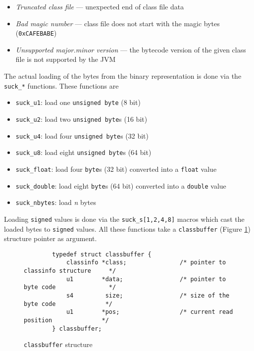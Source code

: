 \begin{itemize}
 \item \textit{Truncated class file} --- unexpected end of class file
 data

 \item \textit{Bad magic number} --- class file does not start with
 the magic bytes (\texttt{0xCAFEBABE})

 \item \textit{Unsupported major.minor version} --- the bytecode
 version of the given class file is not supported by the JVM
\end{itemize}

The actual loading of the bytes from the binary representation is done
via the \texttt{suck\_*} functions. These functions are

\begin{itemize}
 \item \texttt{suck\_u1}: load one \texttt{unsigned byte} (8 bit)

 \item \texttt{suck\_u2}: load two \texttt{unsigned byte}s (16 bit)

 \item \texttt{suck\_u4}: load four \texttt{unsigned byte}s (32 bit)

 \item \texttt{suck\_u8}: load eight \texttt{unsigned byte}s (64 bit)

 \item \texttt{suck\_float}: load four \texttt{byte}s (32 bit)
 converted into a \texttt{float} value

 \item \texttt{suck\_double}: load eight \texttt{byte}s (64 bit)
 converted into a \texttt{double} value

 \item \texttt{suck\_nbytes}: load \textit{n} bytes
\end{itemize}

Loading \texttt{signed} values is done via the
\texttt{suck\_s[1,2,4,8]} macros which cast the loaded bytes to
\texttt{signed} values. All these functions take a
\texttt{classbuffer} (Figure \ref{classbufferstructure}) structure
pointer as argument.

\begin{figure}[h]
\begin{verbatim}
        typedef struct classbuffer {
            classinfo *class;               /* pointer to classinfo structure     */
            u1        *data;                /* pointer to byte code               */
            s4         size;                /* size of the byte code              */
            u1        *pos;                 /* current read position              */
        } classbuffer;
\end{verbatim}
\caption{\texttt{classbuffer} structure}
\label{classbufferstructure}
\end{figure}

